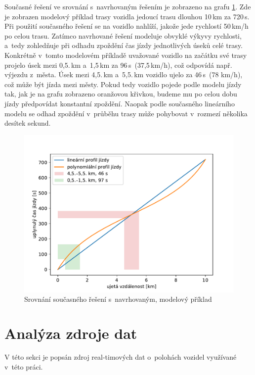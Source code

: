 \bigbreak

Současné řešení ve srovnání s~navrhovaným řešením je zobrazeno na grafu \ref{fig:lin_vs_poly}. Zde je zobrazen modelový příklad trasy vozidla jedoucí trasu dlouhou 10\,km za 720\,s. Při použití současného řešení se na vozidlo nahlíží, jakože jede rychlostí 50\,km/h po celou trasu. Zatímco navrhované řešení modeluje obvyklé výkyvy rychlosti, a~tedy zohledňuje při odhadu zpoždění čas jízdy jednotlivých úseků celé trasy. Konkrétně v~tomto modelovém příkladě uvažované vozidlo na začátku své trasy projelo úsek mezi 0,5.\,km a~1,5\,km za 96\,s~(37,5\,km/h), což odpovídá např. výjezdu z~města. Úsek mezi 4,5.\,km a~5,5.\,km vozidlo ujelo za 46\,s~(78 km/h), což může být jízda mezi městy. Pokud tedy vozidlo pojede podle modelu jízdy tak, jak je na grafu zobrazeno oranžovou křivkou, budeme mu po celou dobu jízdy předpovídat konstantní zpoždění. Naopak podle současného lineárního modelu se odhad zpoždění v~průběhu trasy může pohybovat v~rozmezí několika desítek sekund.

\begin{figure}
	\centering
  \includegraphics[width=\linewidth]{../img/lin_vs_poly}
  \caption{Srovnání současného řešení s~navrhovaným, modelový příklad}
  \label{fig:lin_vs_poly}
\end{figure}

\section{Analýza zdroje dat} \label{chapter:analyza_zdroje}

V této sekci je popsán zdroj real-timových dat o~polohách vozidel využívané v~této práci.

